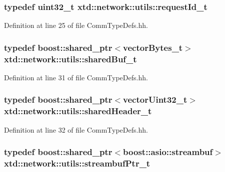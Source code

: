 \hypertarget{namespacextd_1_1network_1_1utils_a0bdb4094852a77df867e219999175200}{
\subsubsection[{request\-Id\-\_\-t}]{\setlength{\rightskip}{0pt plus 5cm}typedef uint32\-\_\-t {\bf xtd\-::network\-::utils\-::request\-Id\-\_\-t}}}\label{namespacextd_1_1network_1_1utils_a0bdb4094852a77df867e219999175200}


Definition at line 25 of file Comm\-Type\-Defs.\-hh.

\hypertarget{namespacextd_1_1network_1_1utils_a92b366b7e2a1ab09ac4f4a0401f8fb84}{
\subsubsection[{shared\-Buf\-\_\-t}]{\setlength{\rightskip}{0pt plus 5cm}typedef boost\-::shared\-\_\-ptr$<${\bf vector\-Bytes\-\_\-t}$>$ {\bf xtd\-::network\-::utils\-::shared\-Buf\-\_\-t}}}\label{namespacextd_1_1network_1_1utils_a92b366b7e2a1ab09ac4f4a0401f8fb84}


Definition at line 31 of file Comm\-Type\-Defs.\-hh.

\hypertarget{namespacextd_1_1network_1_1utils_af5b287652a0fd8fca54642f8d3ca07fa}{
\subsubsection[{shared\-Header\-\_\-t}]{\setlength{\rightskip}{0pt plus 5cm}typedef boost\-::shared\-\_\-ptr$<${\bf vector\-Uint32\-\_\-t}$>$ {\bf xtd\-::network\-::utils\-::shared\-Header\-\_\-t}}}\label{namespacextd_1_1network_1_1utils_af5b287652a0fd8fca54642f8d3ca07fa}


Definition at line 32 of file Comm\-Type\-Defs.\-hh.

\hypertarget{namespacextd_1_1network_1_1utils_aaaf1b50be1864a40d85efd18979631e1}{
\subsubsection[{streambuf\-Ptr\-\_\-t}]{\setlength{\rightskip}{0pt plus 5cm}typedef boost\-::shared\-\_\-ptr$<$boost\-::asio\-::streambuf$>$ {\bf xtd\-::network\-::utils\-::streambuf\-Ptr\-\_\-t}}}\label{namespacextd_1_1network_1_1utils_aaaf1b50be1864a40d85efd18979631e1}


